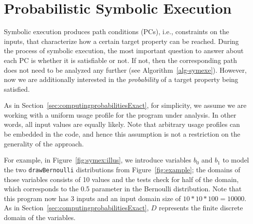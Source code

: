 \section{Probabilistic Symbolic Execution}
\label{sec:pse}

Symbolic execution produces path conditions (PCs), i.e., constraints on the inputs, that characterize how a certain target property can be reached. During the process of symbolic execution, the most important question to answer about each PC is whether it is satisfiable or not.  If not, then the corresponding path does not need to be analyzed any further (see Algorithm~\ref{alg-symexe}).  However, now we are additionally interested in the \emph{probability} of a target property being satisfied. 

As in Section~\ref{sec:computingprobabilitiesExact}, for simplicity, we assume we are working with a uniform usage profile for the program under analysis.  In other words, all input values are equally likely.  Note that arbitrary usage profiles can be embedded in the code, and hence this assumption is not a restriction on the generality of the approach. 

For example, in Figure~\ref{fig:symex:illus}, 
we introduce variables $b_0$ and $b_1$ to model 
the two {\tt drawBernoulli} distributions from Figure~\ref{fig:example};
the domains of those variables consists of 10 values and the tests
check for half of the domain, which corresponds to the 0.5 parameter
in the Bernoulli distribution.
Note that this program now has 3 inputs and an input domain size of
$10 * 10 * 100 = 10000$.
As in Section~\ref{sec:computingprobabilitiesExact}, $D$ represents the finite discrete domain of the variables.

